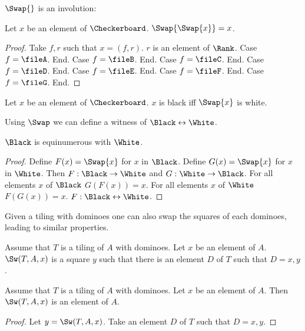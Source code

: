 $\Swap{}$ is an involution:

\begin{forthel}
    \begin{lemma}
        Let $x$ be an element of $\Checkerboard$.
        $\Swap{\Swap{x}} = x$.
    \end{lemma}
    \begin{proof}
        Take $f, r$ such that $x = (f,r)$. $r$ is an element of $\Rank$.
        Case $f = \fileA$. End.
        Case $f = \fileB$. End.
        Case $f = \fileC$. End.
        Case $f = \fileD$. End.
        Case $f = \fileE$. End.
        Case $f = \fileF$. End.
        Case $f = \fileG$. End.
    \end{proof}

    \begin{lemma}
        Let $x$ be an element of $\Checkerboard$.
        $x$ is black iff $\Swap{x}$ is white.
    \end{lemma}
\end{forthel}

Using $\Swap$ we can define a witness of $\Black \leftrightarrow \White$.

\begin{forthel}
    \begin{lemma}
        $\Black$ is equinumerous with $\White$.
    \end{lemma}
    \begin{proof}
        Define $F(x) = \Swap{x}$ for $x$ in $\Black$.
        Define $G(x) = \Swap{x}$ for $x$ in $\White$.
        Then $F : \Black \to \White$ and $G : \White \to \Black$.
        For all elements $x$ of $\Black$ $G(F(x)) = x$.
        For all elements $x$ of $\White$ $F(G(x)) = x$.
        $F : \Black \leftrightarrow \White$.
    \end{proof}
\end{forthel}

Given a tiling with dominoes one can also swap the squares of each dominoes,
leading to similar properties.

\begin{forthel}
    \begin{signature}
        Assume that $T$ is a tiling of $A$ with dominoes.
        Let $x$ be an element of $A$.
        $\Sw(T,A,x)$ is a square $y$ such that there is an element $D$ of $T$
        such that $D = {x,y}$.
    \end{signature}

    \begin{lemma}
        Assume that $T$ is a tiling of $A$ with dominoes.
        Let $x$ be an element of $A$.
        Then $\Sw(T,A,x)$ is an element of $A$.
    \end{lemma}
    \begin{proof}
        Let $y = \Sw(T,A,x)$.
        Take an element $D$ of $T$ such that $D = {x,y}$.
    \end{proof}
\end{forthel}


